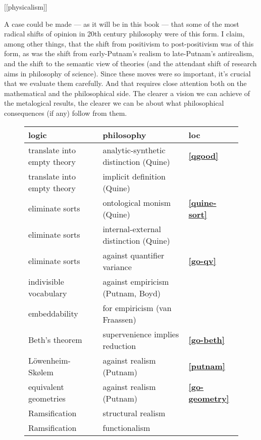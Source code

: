 [[physicalism]]



A case could be made --- as it will be in this book --- that some of
the most radical shifts of opinion in 20th century philosophy were of
this form.  I claim, among other things, that the shift from
positivism to post-positivism was of this form, as was the shift from
early-Putnam's realism to late-Putnam's antirealism, and the shift to
the semantic view of theories (and the attendant shift of research
aims in philosophy of science).  Since these moves were so important,
it's crucial that we evaluate them carefully.  And that requires close
attention both on the mathematical and the philosophical side.  The
clearer a vision we can achieve of the metalogical results, the
clearer we can be about what philosophical consequences (if any)
follow from them.


\begin{figure}[h]
\begin{tabular}{l | l | l}
  logic & philosophy & loc \\
  \hline \hline
  translate into empty theory & analytic-synthetic distinction (Quine) & \textbf{\ref{qgood}} \\
  \hline
  translate into empty theory & implicit definition (Quine) \\
  \hline   
  eliminate sorts & ontological monism (Quine)  & \textbf{\ref{quine-sort}} \\
  \hline
  eliminate sorts & internal-external distinction (Quine) \\
  \hline        
  eliminate sorts & against quantifier variance & \textbf{\ref{go-qv}} \\
  \hline  indivisible vocabulary   & against empiricism (Putnam, Boyd) \\
  \hline
  embeddability   & for empiricism (van Fraassen) \\
  \hline 
  Beth's theorem & supervenience implies reduction & \textbf{\ref{go-beth}} \\          
  \hline L{\"o}wenheim-Sk{\o}lem & against realism (Putnam) & \textbf{\ref{putnam}} \\
  \hline
  equivalent geometries  & against realism (Putnam) & \textbf{\ref{go-geometry}} \\
  \hline Ramsification & structural realism & \\
  \hline Ramsification & functionalism & \\ 
  \hline
\end{tabular}
\end{figure}

